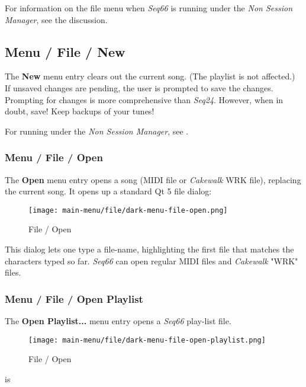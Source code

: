    For information on the file menu when \textsl{Seq66} is
   running under the \textsl{Non Session Manager}, see
   the  discussion.


\subsection{Menu / File / New}
\label{subsec:menu_file_new}

   The \textbf{New} menu entry clears out the current song.
   (The playlist is not affected.)
   If unsaved changes are pending, the user is prompted to save the changes.
   Prompting for changes is more comprehensive than \textsl{Seq24}.
   However, when in doubt, save!  Keep backups of your tunes!

   For running under the \textsl{Non Session Manager}, see
   .

\subsubsection{Menu / File / Open}
\label{subsubsec:seq66_menu_file_open}

   The \textbf{Open} menu entry opens a song (MIDI file or \textsl{Cakewalk}
   WRK file), replacing the current song.
   It opens up a standard Qt 5 file dialog:

\begin{figure}[H]
   \centering 
   \texttt{[image: main-menu/file/dark-menu-file-open.png]}
   \caption{File / Open}
   \label{fig:seq66_menu_file_open}
\end{figure}

   This dialog lets one type a file-name, highlighting the first file
   that matches the characters typed so far.
   \textsl{Seq66} can open regular MIDI files and
   \textsl{Cakewalk} "WRK" files.

\subsubsection{Menu / File / Open Playlist}
\label{subsubsec:seq66_menu_file_open}

   The \textbf{Open Playlist...} menu entry opens a \textsl{Seq66}
   play-list file.

\begin{figure}[H]
   \centering 
   \texttt{[image: main-menu/file/dark-menu-file-open-playlist.png]}
   \caption{File / Open}
   \label{fig:seq66_menu_file_open_playlist}
\end{figure}is

